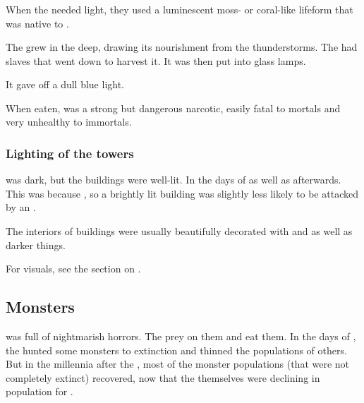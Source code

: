 \subsubsection{\Glowmoss}
\index{\glowmoss}
When the \resphain{} needed light, they used a luminescent moss- or coral-like lifeform that was native to \Nyx. 

The \glowmoss{} grew in the deep, drawing its nourishment from the thunderstorms. 
The \resphain{} had slaves that went down to harvest it. 
It was then put into glass lamps. 

It gave off a dull blue light. 

When eaten, \glowmoss was a strong but dangerous narcotic, easily fatal to mortals and very unhealthy to immortals. 





\subsubsection{Lighting of the towers}
\Nyx was dark, but the \resphan buildings were well-lit. 
In the days of \Merkyrah as well as afterwards. 
This was because , so a brightly lit building was slightly less likely to be attacked by an \umbra.

The interiors of buildings were usually beautifully decorated with  and  as well as darker things. 

For visuals, see the section on . 









\subsection{Monsters}
\Nyx{} was full of nightmarish horrors. 
The \resphain{} prey on them and eat them. 
In the days of \Merkyrah, the \resphain{} hunted some monsters to extinction and thinned the populations of others. 
But in the millennia after the , most of the monster populations (that were not completely extinct) recovered, now that the \resphain{} themselves were declining in population for . 





